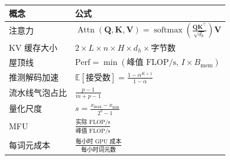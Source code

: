 
\begin{center}
\renewcommand{\arraystretch}{1.5}
\begin{tabular}{@{}p{.28\linewidth}l@{}}
\toprule
\textbf{概念} & \textbf{公式} \\
\midrule
注意力 & $\operatorname{Attn}(\mathbf{Q},\mathbf{K},\mathbf{V})
  =\operatorname{softmax}\!\left(\frac{\mathbf{Q}\mathbf{K}^{\top}}{\sqrt{d_k}}\right)\mathbf{V}$ \\
KV 缓存大小 & $2\times L\times n\times H\times d_h\times\text{字节数}$ \\
屋顶线 & $\mathrm{Perf}=\min(\text{峰值 FLOP/s},\,I\times B_{\mathrm{mem}})$ \\
推测解码加速 & $\mathbb{E}[\text{接受数}]=\frac{1-\alpha^{K+1}}{1-\alpha}$ \\
流水线气泡占比 & $\frac{p-1}{m+p-1}$ \\
量化尺度 & $s=\frac{x_{\max}-x_{\min}}{2^b-1}$ \\
MFU & $\frac{\text{实际 FLOP/s}}{\text{峰值 FLOP/s}}$ \\
每词元成本 & $\frac{\text{每小时 GPU 成本}}{\text{每小时词元数}}$ \\
\bottomrule
\end{tabular}
\end{center}

